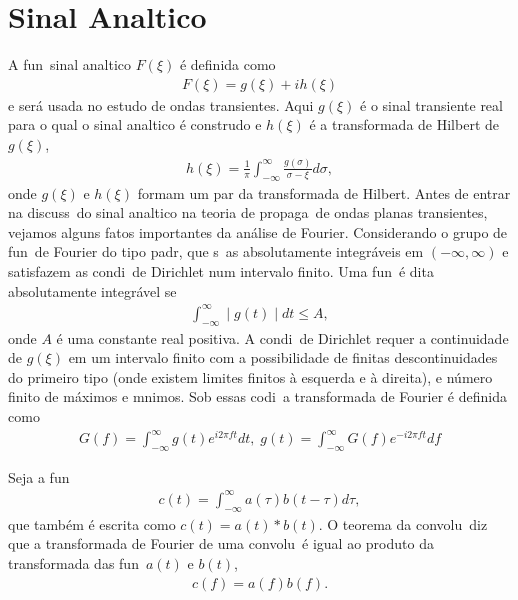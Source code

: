 \section{Sinal Anal\ih tico}

A fun\cao\ sinal anal\ih tico $F(\xi)$ \'e definida como
\begin{eqnarray}
F(\xi) = g(\xi) + ih(\xi)
\end{eqnarray}
e ser\'a usada no estudo de ondas transientes. Aqui $g(\xi)$ \'e o
sinal transiente real para o qual o sinal anal\ih tico \'e
constru\ih do e $h(\xi)$ \'e a transformada de Hilbert de
$g(\xi)$,
\begin{eqnarray}
h(\xi) =
\frac{1}{\pi}\int_{-\infty}^{\infty}\frac{g(\sigma)}{\sigma-\xi}d\sigma,
\end{eqnarray}
onde $g(\xi)$ e $h(\xi)$ formam um par da transformada de Hilbert.
Antes de entrar na discuss\ao\ do sinal anal\ih tico na teoria de
propaga\cao\ de ondas planas transientes, vejamos alguns fatos
importantes da an\'alise de Fourier. Considerando o grupo de
fun\coes\ de Fourier do tipo padr\ao, que s\ao\ as absolutamente
integr\'aveis em $(-\infty,\infty)$ e satisfazem as condi\coes\ de
Dirichlet num intervalo finito. Uma fun\cao\ \'e dita
absolutamente integr\'avel se
\begin{eqnarray}
\int_{-\infty}^{\infty}\mid g(t)\mid dt \leq A,
\end{eqnarray}
onde $A$ \'e uma constante real positiva. A condi\cao\ de
Dirichlet requer a continuidade de $g(\xi)$ em um intervalo finito
com a possibilidade de finitas descontinuidades do primeiro tipo
(onde existem limites finitos \`a esquerda e \`a direita), e
n\'umero finito de m\'aximos e m\ih nimos. Sob essas codi\coes\ a
transformada de Fourier \'e definida como
\begin{eqnarray}
G(f) = \int_{-\infty}^{\infty}g(t)e^{i2\pi ft}dt,\; g(t) =
\int_{-\infty}^{\infty}G(f)e^{-i2\pi ft}df
\end{eqnarray}

Seja a fun\cao
\begin{eqnarray}
c(t) = \int_{-\infty}^{\infty} a(\tau)b(t-\tau)d\tau,
\end{eqnarray}
que tamb\'em \'e escrita como $c(t) = a(t)*b(t)$. O teorema da
convolu\cao\ diz que a transformada de Fourier de uma convolu\cao\
\'e igual ao produto da transformada das fun\coes\ $a(t)$ e
$b(t)$,
\begin{eqnarray}
c(f) = a(f)b(f).
\end{eqnarray}

